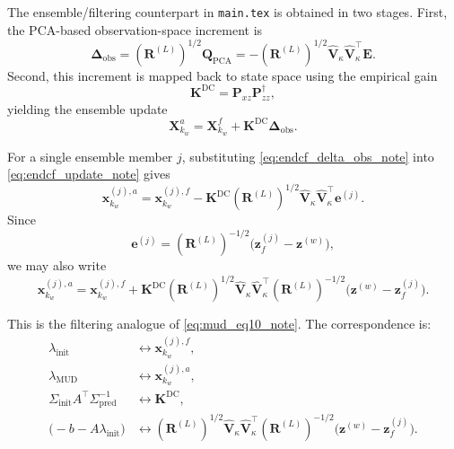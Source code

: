 \documentclass[11pt]{article}
\begin{document}
The ensemble/filtering counterpart in \texttt{main.tex} is obtained in two stages. First, the PCA-based observation-space increment is
\begin{equation}
\boldsymbol{\Delta}_{\mathrm{obs}}
=
(\mathbf{R}^{(L)})^{1/2}\mathbf{Q}_{\mathrm{PCA}}
=
-(\mathbf{R}^{(L)})^{1/2}\hat{\mathbf{V}}_\kappa\hat{\mathbf{V}}_\kappa^\top \mathbf{E}.
\label{eq:endcf_delta_obs_note}
\end{equation}
Second, this increment is mapped back to state space using the empirical gain
\begin{equation}
\mathbf{K}^{\mathrm{DC}}
=
\mathbf{P}_{xz}\mathbf{P}_{zz}^\dagger,
\end{equation}
yielding the ensemble update
\begin{equation}
\mathbf{X}_{k_w}^{a}
=
\mathbf{X}_{k_w}^{f}
+
\mathbf{K}^{\mathrm{DC}}\boldsymbol{\Delta}_{\mathrm{obs}}.
\label{eq:endcf_update_note}
\end{equation}

For a single ensemble member $j$, substituting \eqref{eq:endcf_delta_obs_note} into \eqref{eq:endcf_update_note} gives
\begin{equation}
\mathbf{x}_{k_w}^{(j),a}
=
\mathbf{x}_{k_w}^{(j),f}
-
\mathbf{K}^{\mathrm{DC}}
(\mathbf{R}^{(L)})^{1/2}
\hat{\mathbf{V}}_\kappa\hat{\mathbf{V}}_\kappa^\top
\mathbf{e}^{(j)}.
\label{eq:endcf_member_update_note}
\end{equation}
Since
\begin{equation}
\mathbf{e}^{(j)}
=
(\mathbf{R}^{(L)})^{-1/2}
\bigl(\mathbf{z}_{f}^{(j)}-\mathbf{z}^{(w)}\bigr),
\end{equation}
we may also write
\begin{equation}
\mathbf{x}_{k_w}^{(j),a}
=
\mathbf{x}_{k_w}^{(j),f}
+
\mathbf{K}^{\mathrm{DC}}
(\mathbf{R}^{(L)})^{1/2}
\hat{\mathbf{V}}_\kappa\hat{\mathbf{V}}_\kappa^\top
(\mathbf{R}^{(L)})^{-1/2}
\bigl(\mathbf{z}^{(w)}-\mathbf{z}_{f}^{(j)}\bigr).
\label{eq:endcf_member_update_expanded_note}
\end{equation}

This is the filtering analogue of \eqref{eq:mud_eq10_note}. The correspondence is:
\begin{align}
\lambda_{\mathrm{init}}
&\longleftrightarrow
\mathbf{x}_{k_w}^{(j),f},
\\
\lambda_{\mathrm{MUD}}
&\longleftrightarrow
\mathbf{x}_{k_w}^{(j),a},
\\
\Sigma_{\mathrm{init}}A^\top\Sigma_{\mathrm{pred}}^{-1}
&\longleftrightarrow
\mathbf{K}^{\mathrm{DC}},
\\
\bigl(-b-A\lambda_{\mathrm{init}}\bigr)
&\longleftrightarrow
(\mathbf{R}^{(L)})^{1/2}
\hat{\mathbf{V}}_\kappa\hat{\mathbf{V}}_\kappa^\top
(\mathbf{R}^{(L)})^{-1/2}
\bigl(\mathbf{z}^{(w)}-\mathbf{z}_{f}^{(j)}\bigr).
\end{align}
\end{document}
